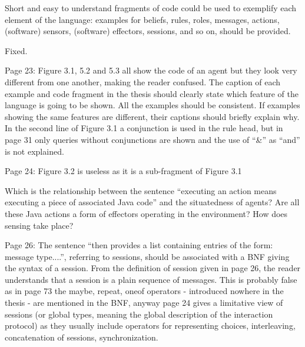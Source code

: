 \documentclass{article}
\newcommand{\todo}[1]{[\textcolor{red}{TODO}: #1]}
\newenvironment{them}{\noindent\begingroup\color{blue}}{\endgroup\par}
\begin{document}
\begin{them}

Short and easy to understand fragments of code could be used to exemplify each element of the language: examples for beliefs, rules, roles, messages, actions, (software) sensors, (software) effectors, sessions, and so on, should be provided.
\end{them}
Fixed. 

\begin{them}

Page 23:
Figure 3.1, 5.2 and 5.3 all show the code of an agent but they look very different from one another, making the reader confused. The caption of each example and code fragment in the thesis should clearly state which feature of the language is going to be shown. All the examples should be consistent. If examples showing the same features are different, their captions should briefly explain why.
In the second line of Figure 3.1 a conjunction is used in the rule head, but in page 31 only queries without conjunctions are shown and the use of “\&” as “and” is not explained.
\end{them}
\todo{} 

\begin{them}

Page 24:
Figure 3.2 is useless as it is a sub-fragment of Figure 3.1
\end{them}
\todo{justify this} 

\begin{them}

Which is the relationship between the sentence “executing an action means executing a piece of
associated Java code” and the situatedness of agents? Are all these Java actions a form of effectors
operating in the environment? How does sensing take place?
\end{them}
\todo{explain this} 

\begin{them}

Page 26:
The sentence “then provides a list containing entries of the form: message type....”, referring to
sessions, should be associated with a BNF giving the syntax of a session. From the definition of
session given in page 26, the reader understands that a session is a plain sequence of messages. This
is probably false as in page 73 the maybe, repeat, oneof operators - introduced nowhere in the thesis
- are mentioned in the BNF, anyway page 24 gives a limitative view of sessions (or global types,
meaning the global description of the interaction protocol) as they usually include operators for
representing choices, interleaving, concatenation of sessions, synchronization. 
\end{them}
\todo{explain this} 
\end{document}
